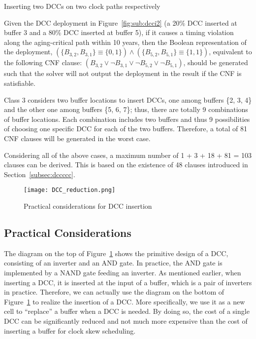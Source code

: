 \begin{class}
\label{class:c3}
Inserting two DCCs on two clock paths respectively

Given the DCC deployment in Figure~\ref{fig:sub:dcci2} (a 20\% DCC inserted at buffer 3 and a 80\% DCC inserted at buffer 5), if it causes a timing violation along the aging-critical path within 10 years, then the Boolean representation of the deployment, $\left(\{B_{3,2}, B_{3,1}\} \equiv \{0, 1\} \right) \land \left( \{B_{5,2}, B_{5,1}\} \equiv \{1, 1\} \right)$, equivalent to the following CNF clause: $\left(B_{3,2} \lor \neg B_{3,1} \lor \neg B_{5,2} \lor \neg B_{5,1} \right)$, should be generated such that the solver will not output the deployment in the result if the CNF is satisfiable.

Class 3 considers two buffer locations to insert DCCs, one among buffers \{2, 3, 4\} and the other one among buffers \{5, 6, 7\}; thus, there are totally 9 combinations of buffer locations. Each combination includes two buffers and thus 9 possibilities of choosing one specific DCC for each of the two buffers. Therefore, a total of 81 CNF clauses will be generated in the worst case.

Considering all of the above cases, a maximum number of 1 + 3 + 18 + 81 = 103 clauses can be derived. This is based on the existence of 48 clauses introduced in Section~\ref{subsec:dccccc}.

\end{class}

\begin{figure}
    \centering
    \texttt{[image: DCC\_reduction.png]}
    \caption{Practical considerations for DCC insertion}
    \label{fig:dccreduc}
\end{figure}

\subsection{Practical Considerations}
\label{subsec:tpc}
The diagram on the top of Figure~\ref{fig:dccreduc} shows the primitive design of a DCC, consisting of an inverter and an AND gate. In practice, the AND gate is implemented by a NAND gate feeding an inverter. As mentioned earlier, when inserting a DCC, it is inserted at the input of a buffer, which is a pair of inverters in practice. Therefore, we can actually use the diagram on the bottom of Figure~\ref{fig:dccreduc} to realize the insertion of a DCC. More specifically, we use it as a new cell to \enquote{replace} a buffer when a DCC is needed. By doing so, the cost of a single DCC can be significantly reduced and not much more expensive than the cost of inserting a buffer for clock skew scheduling. 